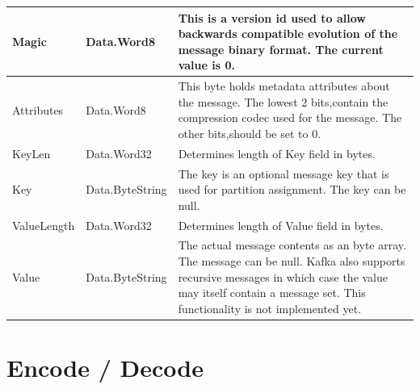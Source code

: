 
\begin{table}[H]
\centering
\begin{tabular}{ l  l  p{10cm} }
\hline
Magic       & Data.Word8      & This is a version id used to allow backwards compatible evolution of the message binary format. The current value is 0.                                         \\ \hline
Attributes  & Data.Word8      & This byte holds metadata attributes about the message. The lowest 2 bits,contain the compression codec used for the message. The other bits,should be set to 0. \\ \hline
KeyLen      & Data.Word32     & Determines length of Key field in bytes.                                                                                                                         \\ \hline
Key         & Data.ByteString & The key is an optional message key that is used for partition assignment. The key can be null.                                                                  \\ \hline
ValueLength & Data.Word32     & Determines length of Value field in bytes.                                                                                                                      \\ \hline
Value       & Data.ByteString & The actual message contents as an byte array. The message can be null. Kafka also supports recursive messages in which case 
                                the value may itself contain a message set. This
                                functionality is not implemented yet.                                                                                                                            \\ \hline
\end{tabular}
\end{table}

\section{Encode / Decode}

